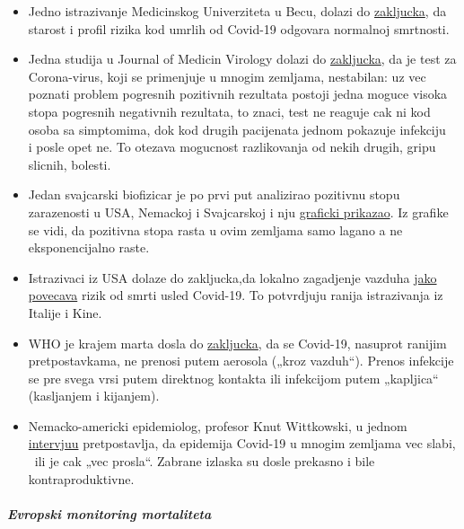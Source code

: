 \begin{itemize}
\item
  Jedno istrazivanje Medicinskog Univerziteta u Becu, dolazi do
  \href{https://www.vienna.at/analyse-zeigt-covid-19-opferkurve-entspricht-normaler-mortalitaet/6581246}{zakljucka},
  da starost i profil rizika kod umrlih od Covid-19 odgovara normalnoj
  smrtnosti.
\item
  Jedna studija u Journal of Medicin Virology dolazi do
  \href{https://www.ncbi.nlm.nih.gov/pubmed/32219885}{zakljucka}, da je
  test za Corona-virus, koji se primenjuje u mnogim zemljama,
  nestabilan: uz vec poznati problem pogresnih pozitivnih rezultata
  postoji jedna moguce visoka stopa pogresnih negativnih rezultata, to
  znaci, test ne reaguje cak ni kod osoba sa simptomima, dok kod drugih
  pacijenata jednom pokazuje infekciju~ i posle opet ne. To otezava
  mogucnost razlikovanja od nekih drugih, gripu slicnih, bolesti.
\item
  Jedan svajcarski biofizicar je po prvi put analizirao pozitivnu stopu
  zarazenosti u USA, Nemackoj i Svajcarskoj i nju
  \href{https://mail.protonmail.com/\#SARSCoV2}{graficki prikazao}. Iz
  grafike se vidi, da pozitivna stopa rasta u ovim zemljama samo lagano
  a ne eksponencijalno raste.
\item
  Istrazivaci iz USA dolaze do zakljucka,da lokalno zagadjenje vazduha
  \href{https://www.heise.de/tp/features/Luftverschmutzung-erhoeht-Covid-19-Sterberisiko-4699306.html}{jako
  povecava} rizik od smrti usled Covid-19. To potvrdjuju ranija
  istrazivanja iz Italije i Kine.
\item
  WHO je krajem marta dosla do
  \href{https://www.who.int/news-room/commentaries/detail/modes-of-transmission-of-virus-causing-covid-19-implications-for-ipc-precaution-recommendations}{zakljucka},
  da se Covid-19, nasuprot ranijim pretpostavkama, ne prenosi putem
  aerosola („kroz vazduh``). Prenos infekcije se pre svega vrsi putem
  direktnog kontakta ili infekcijom putem „kapljica`` (kasljanjem i
  kijanjem).
\item
  Nemacko-americki epidemiolog, profesor Knut Wittkowski, u jednom
  \href{https://www.youtube.com/watch?v=ARTf4bpiXuI}{intervjuu}
  pretpostavlja, da epidemija Covid-19 u mnogim zemljama vec slabi, ~ili
  je cak „vec prosla``. Zabrane izlaska su dosle prekasno i bile
  kontraproduktivne.
\end{itemize}

\hypertarget{evropski-monitoring-mortaliteta}{%
\subparagraph{\texorpdfstring{\textbf{Evropski monitoring
mortaliteta}}{Evropski monitoring mortaliteta}}\label{evropski-monitoring-mortaliteta}}

